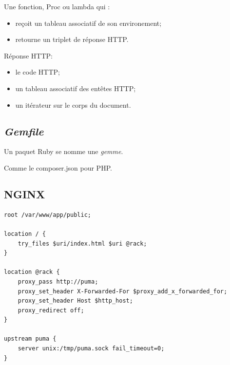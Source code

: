Une fonction, Proc ou lambda qui :

\begin{itemize}
\tightlist
\item
  reçoit un tableau associatif de son environement;
\item
  retourne un triplet de réponse HTTP.
\end{itemize}

Réponse HTTP:

\begin{itemize}
\tightlist
\item
  le code HTTP;
\item
  un tableau associatif des entêtes HTTP;
\item
  un itérateur sur le corps du document.
\end{itemize}

\hypertarget{gemfile}{%
\subsection{\texorpdfstring{\emph{Gemfile}}{Gemfile}}\label{gemfile}}

Un paquet Ruby se nomme une \emph{gemme}.

\begin{english}

\begin{Shaded}
\begin{Highlighting}[]

\NormalTok{, }
\end{Highlighting}
\end{Shaded}

\end{english}

Comme le composer.json pour PHP.

\hypertarget{nginx}{%
\subsection{NGINX}\label{nginx}}

\begin{english}

\begin{verbatim}
root /var/www/app/public;

location / {
    try_files $uri/index.html $uri @rack;
}

location @rack {
    proxy_pass http://puma;
    proxy_set_header X-Forwarded-For $proxy_add_x_forwarded_for;
    proxy_set_header Host $http_host;
    proxy_redirect off;
}

upstream puma {
    server unix:/tmp/puma.sock fail_timeout=0;
}
\end{verbatim}

\end{english}

